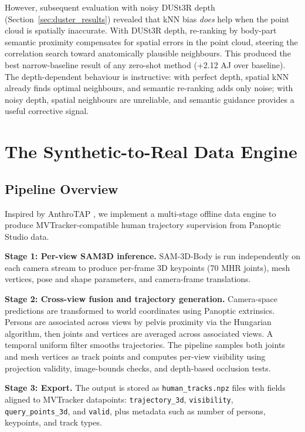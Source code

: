 \documentclass[12pt, a4paper, oneside]{report}
\begin{document}
However, subsequent evaluation with noisy DUSt3R depth (Section~\ref{sec:duster_results}) revealed that kNN bias \emph{does} help when the point cloud is spatially inaccurate. With DUSt3R depth, re-ranking by body-part semantic proximity compensates for spatial errors in the point cloud, steering the correlation search toward anatomically plausible neighbours. This produced the best narrow-baseline result of any zero-shot method (+2.12 AJ over baseline). The depth-dependent behaviour is instructive: with perfect depth, spatial kNN already finds optimal neighbours, and semantic re-ranking adds only noise; with noisy depth, spatial neighbours are unreliable, and semantic guidance provides a useful corrective signal.

\chapter{The Synthetic-to-Real Data Engine}
\label{ch:data}
\section{Pipeline Overview}
Inspired by AnthroTAP \cite{kim2026anthrotaplearningpointtracking}, we implement a multi-stage offline data engine to produce MVTracker-compatible human trajectory supervision from Panoptic Studio \cite{joo2015panoptic} data.

\textbf{Stage 1: Per-view SAM3D inference.} SAM-3D-Body is run independently on each camera stream to produce per-frame 3D keypoints (70 MHR joints), mesh vertices, pose and shape parameters, and camera-frame translations.

\textbf{Stage 2: Cross-view fusion and trajectory generation.} Camera-space predictions are transformed to world coordinates using Panoptic extrinsics. Persons are associated across views by pelvis proximity via the Hungarian algorithm, then joints and vertices are averaged across associated views. A temporal uniform filter smooths trajectories. The pipeline samples both joints and mesh vertices as track points and computes per-view visibility using projection validity, image-bounds checks, and depth-based occlusion tests.

\textbf{Stage 3: Export.} The output is stored as \texttt{human\_tracks.npz} files with fields aligned to MVTracker datapoints: \texttt{trajectory\_3d}, \texttt{visibility}, \texttt{query\_points\_3d}, and \texttt{valid}, plus metadata such as number of persons, keypoints, and track types.
\end{document}
